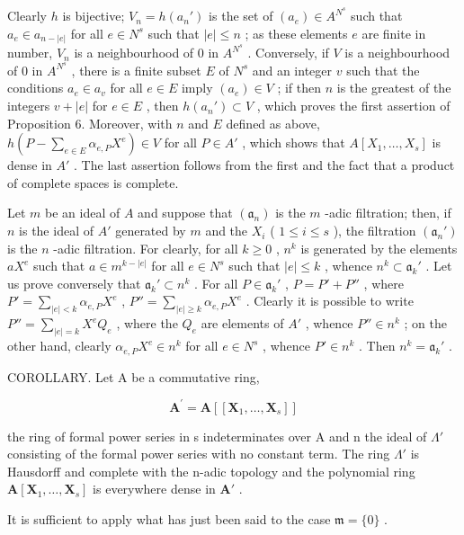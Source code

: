 Clearly \(h\) is bijective; \(V_n = h(a_n')\) is the set of \((a_e) \in A^{N^s}\) such that \(a_e \in a_{n-|e|}\) for all \(e \in N^s\) such that \(|e| \leqslant n\) ; as these elements \(e\) are finite in number, \(V_n\) is a neighbourhood of 0 in \(A^{N^s}\) . Conversely, if \(V\) is a neighbourhood of 0 in \(A^{N^s}\) , there is a finite subset \(E\) of \(N^s\) and an integer \(v\) such that the conditions \(a_e \in a_v\) for all \(e \in E\) imply \((a_e) \in V\) ; if then \(n\) is the greatest of the integers \(v + |e|\) for \(e \in E\) , then \(h(a_n') \subset V\) , which proves the first assertion of Proposition 6. Moreover, with \(n\) and \(E\) defined as above, \(h(P - \sum_{e \in E} \alpha_{e, P} X^e) \in V\) for all \(P \in A'\) , which shows that \(A[X_1, \ldots, X_s]\) is dense in \(A'\) . The last assertion follows from the first and the fact that a product of complete spaces is complete.

Let \(m\) be an ideal of \(A\) and suppose that \((\mathfrak{a}_n)\) is the \(m\) -adic filtration; then, if \(n\) is the ideal of \(A'\) generated by \(m\) and the \(X_i\) ( \(1 \leqslant i \leqslant s\) ), the filtration \((\mathfrak{a}_n')\) is the \(n\) -adic filtration. For clearly, for all \(k \geqslant 0\) , \(n^k\) is generated by the elements \(aX^e\) such that \(a \in m^{k-|e|}\) for all \(e \in N^s\) such that \(|e| \leqslant k\) , whence \(n^k \subset \mathfrak{a}_k'\) . Let us prove conversely that \(\mathfrak{a}_k' \subset n^k\) . For all \(P \in \mathfrak{a}_k'\) , \(P = P' + P''\) , where \(P' = \sum_{|e| < k} \alpha_{e,P} X^e\) , \(P'' = \sum_{|e| \geqslant k} \alpha_{e,P} X^e\) . Clearly it is possible to write \(P'' = \sum_{|e|=k} X^e Q_e\) , where the \(Q_e\) are elements of \(A'\) , whence \(P'' \in n^k\) ; on the other hand, clearly \(\alpha_{e,P} X^e \in n^k\) for all \(e \in N^s\) , whence \(P' \in n^k\) . Then \(n^k = \mathfrak{a}_k'\) .

COROLLARY. Let A be a commutative ring,

\[
\mathbf {A} ^ {\prime} = \mathbf {A} [ [ \mathbf {X} _ {1}, \dots , \mathbf {X} _ {s} ] ]
\]

the ring of formal power series in s indeterminates over A and n the ideal of \(\Lambda'\) consisting of the formal power series with no constant term. The ring \(\Lambda'\) is Hausdorff and complete with the n-adic topology and the polynomial ring \(\mathbf{A}[\mathbf{X}_1,\dots ,\mathbf{X}_s]\) is everywhere dense in \(\mathbf{A}'\) .

It is sufficient to apply what has just been said to the case \(\mathfrak{m} = \{0\}\) .


